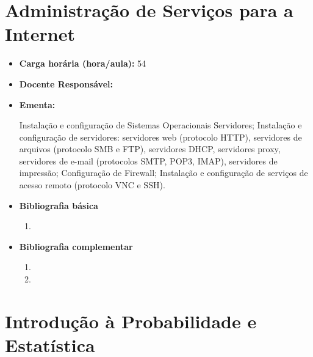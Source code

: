 \documentclass[11pt,fleqn]{book} %
\begin{document}

\newpage
\section{Administração de Serviços para a Internet}\label{disc:asi}

\begin{itemize}
	\item \textbf{Carga horária (hora/aula):} 54
	\item \textbf{Docente Responsável:}~
	\item \textbf{Ementa:} 

	Instalação e configuração de Sistemas Operacionais Servidores; Instalação e configuração de servidores: servidores web (protocolo HTTP), servidores de arquivos (protocolo SMB e FTP), servidores DHCP, servidores proxy, servidores de e-mail (protocolos SMTP, POP3, IMAP), servidores de impressão; 
	Configuração de Firewall; 
	Instalação e configuração de serviços de acesso remoto (protocolo VNC e SSH).
	
	\item \textbf{Bibliografia básica}
	\begin{enumerate}
		\item 
	\end{enumerate}
	\item \textbf{Bibliografia complementar}
	\begin{enumerate}
		\item
		\item 
	\end{enumerate}
\end{itemize}


\newpage
\section{Introdução à Probabilidade e Estatística}\label{disc:probest}
\end{document}
